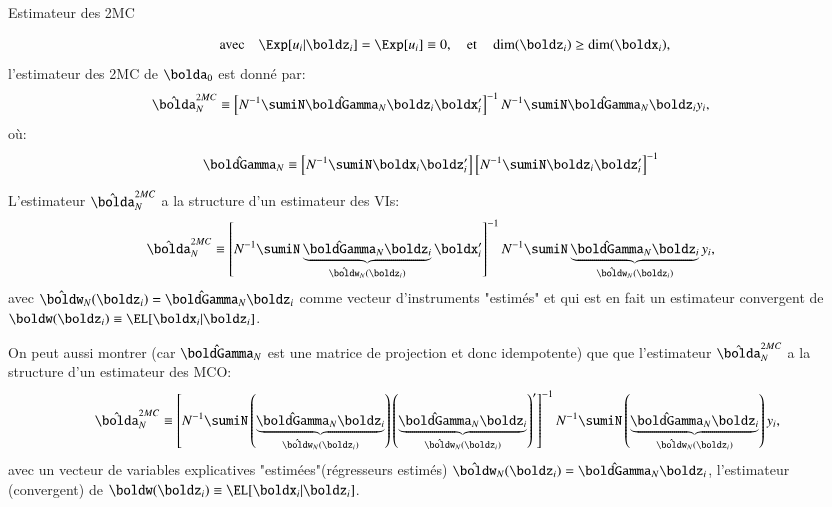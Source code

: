 \begin{frame}[allowframebreaks]{Estimateur des 2MC}
\begin{definition_fr}
\begin{align*}
    \quad \text{avec} \quad \Exp[u_i|\boldz_i] = \Exp[u_i] \equiv 0, \quad \text{et} \quad 
    \dim(\boldz_i) \geq \dim(\boldx_i),
\end{align*}
l'estimateur des 2MC de $\bolda_0$ est donné par: 
\begin{align*}
\hat{\bolda}_N^{2MC} &\equiv 
\left[
    N^{-1}\sumiN\hat{\boldGamma}_N\boldz_i\boldx_i^\prime
\right]^{-1} 
N^{-1}\sumiN\hat{\boldGamma}_N\boldz_iy_i,
\end{align*}
où:
\begin{align*}
    \hat{\boldGamma}_N&\equiv  
    \left[N^{-1}\sumiN\boldx_i\boldz_i^\prime\right]
    \left[N^{-1}\sumiN\boldz_i\boldz_i^\prime\right]^{-1}
\end{align*}
\label{def5}
\end{definition_fr}

\framebreak 

\begin{remark_fr}
    L’estimateur $\hat{\bolda}_N^{2MC}$ a la structure d’un estimateur des VIs: 
    \begin{align*}
        \hat{\bolda}_N^{2MC} &\equiv 
        \left[
            N^{-1}\sumiN\underbrace{\hat{\boldGamma}_N\boldz_i}_{\hat{\boldw}_N(\boldz_i)}\boldx_i^\prime
        \right]^{-1} 
        N^{-1}\sumiN \underbrace{\hat{\boldGamma}_N\boldz_i}_{\hat{\boldw}_N(\boldz_i)} y_i,
    \end{align*}
    avec $\hat{\boldw}_N(\boldz_i) = \hat{\boldGamma}_N\boldz_i$  comme vecteur d’instruments 
    "estimés" et qui est en fait un estimateur convergent 
    de $\boldw(\boldz_i)\equiv\EL[\boldx_i|\boldz_i]$.
\end{remark_fr}
\framebreak
\begin{remark_fr}
On peut aussi montrer (car $\hat{\boldGamma}_N$ est une matrice de 
    projection et donc idempotente) que que l’estimateur $\hat{\bolda}^{2MC}_N$
    a la structure d’un estimateur des MCO:
    \begin{align*}
        \hat{\bolda}^{2MC}_N \equiv \left[
            N^{-1}\sumiN \left( \underbrace{\hat{\boldGamma}_N\boldz_i}_{\hat{\boldw}_N(\boldz_i)}  \right)
            \left(\underbrace{\hat{\boldGamma}_N\boldz_i}_{\hat{\boldw}_N(\boldz_i)}\right)^\prime
        \right]^{-1}N^{-1}
        \sumiN  \left(\underbrace{\hat{\boldGamma}_N\boldz_i}_{\hat{\boldw}_N(\boldz_i)}\right)y_i,
    \end{align*}
    avec un vecteur de variables explicatives "estimées"(régresseurs
estimés) $\hat{\boldw}_N(\boldz_i) = \hat{\boldGamma}_N\boldz_i$,  
l’estimateur (convergent) de $\boldw(\boldz_i)\equiv\EL[\boldx_i|\boldz_i]$.
\end{remark_fr}


\end{frame}
